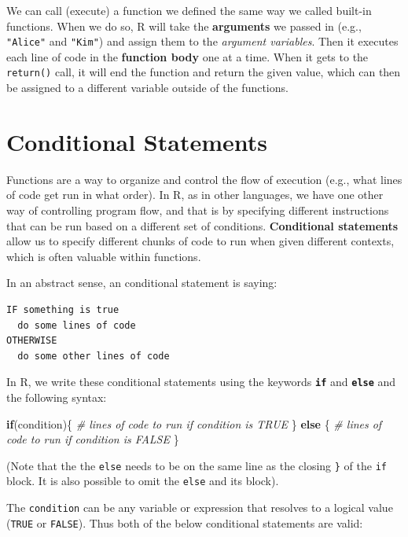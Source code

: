 \documentclass[]{book}
\newenvironment{Shaded}{\begin{snugshade}}{\end{snugshade}}
\newcommand{\CommentTok}[1]{\textcolor[rgb]{0.56,0.35,0.01}{\textit{#1}}}
\newcommand{\ControlFlowTok}[1]{\textcolor[rgb]{0.13,0.29,0.53}{\textbf{#1}}}
\newcommand{\NormalTok}[1]{#1}
\theoremstyle{definition}
\theoremstyle{definition}
\theoremstyle{remark}
\begin{document}
We can call (execute) a function we defined the same way we called
built-in functions. When we do so, R will take the \textbf{arguments} we
passed in (e.g., \texttt{"Alice"} and \texttt{"Kim"}) and assign them to
the \emph{argument variables}. Then it executes each line of code in the
\textbf{function body} one at a time. When it gets to the
\texttt{return()} call, it will end the function and return the given
value, which can then be assigned to a different variable outside of the
functions.

\section{Conditional Statements}\label{conditional-statements}

Functions are a way to organize and control the flow of execution (e.g.,
what lines of code get run in what order). In R, as in other languages,
we have one other way of controlling program flow, and that is by
specifying different instructions that can be run based on a different
set of conditions. \textbf{Conditional statements} allow us to specify
different chunks of code to run when given different contexts, which is
often valuable within functions.

In an abstract sense, an conditional statement is saying:

\begin{verbatim}
IF something is true
  do some lines of code
OTHERWISE
  do some other lines of code
\end{verbatim}

In R, we write these conditional statements using the keywords
\textbf{\texttt{if}} and \textbf{\texttt{else}} and the following
syntax:

\begin{Shaded}
\begin{Highlighting}[]
\ControlFlowTok{if}\NormalTok{(condition)\{}
  \CommentTok{# lines of code to run if condition is TRUE}
\NormalTok{\} }\ControlFlowTok{else}\NormalTok{ \{}
  \CommentTok{# lines of code to run if condition is FALSE}
\NormalTok{\}}
\end{Highlighting}
\end{Shaded}

(Note that the the \texttt{else} needs to be on the same line as the
closing \texttt{\}} of the \texttt{if} block. It is also possible to
omit the \texttt{else} and its block).

The \texttt{condition} can be any variable or expression that resolves
to a logical value (\texttt{TRUE} or \texttt{FALSE}). Thus both of the
below conditional statements are valid:
\end{document}
